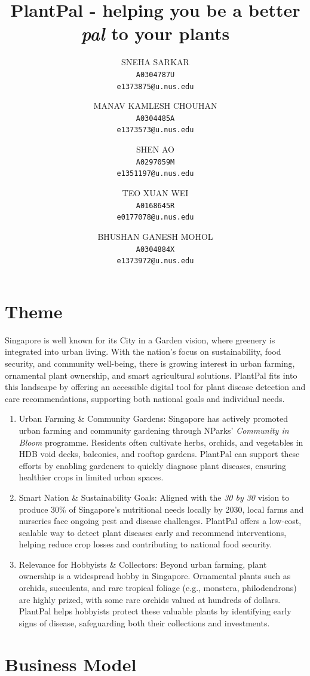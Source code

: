 \documentclass[11pt]{article}
\title{PlantPal - helping you be a better \textit{pal} to your plants
}
\author{
    \begin{tabular}[t]{l}
        SNEHA SARKAR \\
        \texttt{A0304787U} \\
        \texttt{e1373875@u.nus.edu} \\
    \end{tabular}
    \and
    \begin{tabular}[t]{l}
        MANAV KAMLESH CHOUHAN \\
        \texttt{A0304485A} \\
        \texttt{e1373573@u.nus.edu} \\
    \end{tabular}
    \and
    \begin{tabular}[t]{l}
        SHEN AO \\
        \texttt{A0297059M} \\
        \texttt{e1351197@u.nus.edu} \\
    \end{tabular}
    \and
    \begin{tabular}[t]{l}
        TEO XUAN WEI \\
        \texttt{A0168645R} \\
        \texttt{e0177078@u.nus.edu} \\
    \end{tabular}
    \and
    \begin{tabular}[t]{l}
        BHUSHAN GANESH MOHOL \\
        \texttt{A0304884X} \\
        \texttt{e1373972@u.nus.edu}
    \end{tabular}
}
\begin{document}
\maketitle

\section{Theme}
Singapore is well known for its City in a Garden vision, where greenery is integrated into urban living. With the nation’s focus on sustainability, food security, and community well-being, there is growing interest in urban farming, ornamental plant ownership, and smart agricultural solutions. PlantPal fits into this landscape by offering an accessible digital tool for plant disease detection and care recommendations, supporting both national goals and individual needs.

\begin{enumerate}
    \item Urban Farming \& Community Gardens: Singapore has actively promoted urban farming and community gardening through NParks’ \textit{Community in Bloom} programme. Residents often cultivate herbs, orchids, and vegetables in HDB void decks, balconies, and rooftop gardens. PlantPal can support these efforts by enabling gardeners to quickly diagnose plant diseases, ensuring healthier crops in limited urban spaces.

    \item Smart Nation \& Sustainability Goals: Aligned with the \textit{30 by 30} vision to produce 30\% of Singapore’s nutritional needs locally by 2030, local farms and nurseries face ongoing pest and disease challenges. PlantPal offers a low-cost, scalable way to detect plant diseases early and recommend interventions, helping reduce crop losses and contributing to national food security.

    \item Relevance for Hobbyists \& Collectors: Beyond urban farming, plant ownership is a widespread hobby in Singapore. Ornamental plants such as orchids, succulents, and rare tropical foliage (e.g., monstera, philodendrons) are highly prized, with some rare orchids valued at hundreds of dollars. PlantPal helps hobbyists protect these valuable plants by identifying early signs of disease, safeguarding both their collections and investments.
\end{enumerate}


\section{Business Model}
\end{document}
